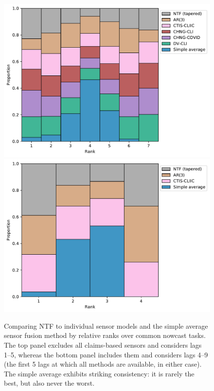 \documentclass[sts]{imsart}
\theoremstyle{plain}
\theoremstyle{definition}
\theoremstyle{remark}
\begin{document}
\begin{figure}[tb]
\centering
\includegraphics[width=0.975\linewidth]{./figures/rankplot_claims_no_google_aa.pdf}
\includegraphics[width=0.975\linewidth]{./figures/rankplot_no_claims_no_google_aa.pdf}
\caption{Comparing NTF to individual sensor models and the simple average sensor
  fusion method by relative ranks over common nowcast tasks. The top panel
  excludes all claims-based sensors and considers lags 1--5, whereas the bottom
  panel includes them and considers lags 4--9 (the first 5 lags at which all
  methods are available, in either case). The simple average exhibits striking
  consistency: it is rarely the best, but also never the worst.} 
	\label{fig:sensor_rank_no_google_aa}
\end{figure}
\end{document}
